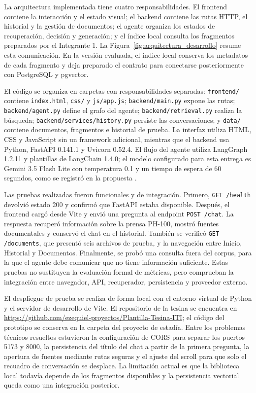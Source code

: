 La arquitectura implementada tiene cuatro responsabilidades. El frontend contiene la interacción y el estado visual;
el backend contiene las rutas HTTP, el historial y la gestión de documentos; el agente organiza los estados de
recuperación, decisión y generación; y el índice local consulta los fragmentos preparados por el Integrante 1. La
Figura~\ref{fig:arquitectura_desarrollo} resume esta comunicación. En la versión evaluada, el índice local conserva los
metadatos de cada fragmento y deja preparado el contrato para conectarse posteriormente con PostgreSQL y pgvector.

El código se organiza en carpetas con responsabilidades separadas: \texttt{frontend/} contiene \texttt{index.html},
\texttt{css/} y \texttt{js/app.js}; \texttt{backend/main.py} expone las rutas; \texttt{backend/agent.py} define el grafo
del agente; \texttt{backend/retrieval.py} realiza la búsqueda; \texttt{backend/services/history.py} persiste las
conversaciones; y \texttt{data/} contiene documentos, fragmentos e historial de prueba. La interfaz utiliza HTML, CSS y
JavaScript sin un framework adicional, mientras que el backend usa Python, FastAPI 0.141.1 y Uvicorn 0.52.4. El flujo
del agente utiliza LangGraph 1.2.11 y plantillas de LangChain 1.4.0; el modelo configurado para esta entrega es Gemini
3.5 Flash Lite con temperatura 0.1 y un tiempo de espera de 60 segundos, como se registró en la propuesta
\cite{fastapiDocs,langchainDocs,langgraphDocs,googleGeminiApi}.

Las pruebas realizadas fueron funcionales y de integración. Primero, \texttt{GET /health} devolvió estado 200 y confirmó
que FastAPI estaba disponible. Después, el frontend cargó desde Vite y envió una pregunta al endpoint \texttt{POST /chat}.
La respuesta recuperó información sobre la prensa PH-100, mostró fuentes documentales y conservó el chat en el historial.
También se verificó \texttt{GET /documents}, que presentó seis archivos de prueba, y la navegación entre Inicio, Historial y
Documentos. Finalmente, se probó una consulta fuera del corpus, para la que el agente debe comunicar que no tiene
información suficiente. Estas pruebas no sustituyen la evaluación formal de métricas, pero comprueban la integración
entre navegador, API, recuperador, persistencia y proveedor externo.

El despliegue de prueba se realiza de forma local con el entorno virtual de Python y el servidor de desarrollo de Vite.
El repositorio de la tesina se encuentra en \url{https://github.com/ezequiel-proyectos/Plantilla-Tesina-ITI}; el código del
prototipo se conserva en la carpeta del proyecto de estadía. Entre los problemas técnicos resueltos estuvieron la
configuración de CORS para separar los puertos 5173 y 8000, la persistencia del título del chat a partir de la primera
pregunta, la apertura de fuentes mediante rutas seguras y el ajuste del scroll para que solo el recuadro de conversación
se desplace. La limitación actual es que la biblioteca local todavía depende de los fragmentos disponibles y la
persistencia vectorial queda como una integración posterior.

